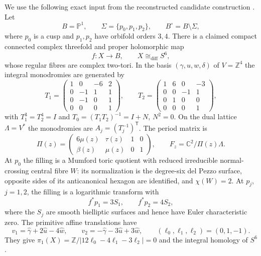 \documentclass[11pt]{article}
\theoremstyle{definition}
\newcommand{\C}{\mathbb C}
\newcommand{\Z}{\mathbb Z}
\newcommand{\PP}{\mathbb P}
\begin{document}
We use the following exact input from the reconstructed candidate
construction \cite{AlpogeS6_2026}.  Let
\[
 B=\PP^1,\qquad \Sigma=\{p_0,p_1,p_2\},\qquad
 B^\circ=B\setminus\Sigma,
\]
where $p_0$ is a cusp and $p_1,p_2$ have orbifold orders $3,4$.
There is a claimed compact connected complex threefold and proper
holomorphic map
\[
 f:X\longrightarrow B,
 \qquad X\cong_{\mathrm{diff}}S^6,
\]
whose regular fibres are complex two-tori.  In the basis
$(\gamma,u,w,\delta)$ of $V=\Z^4$ the integral monodromies are generated by
\begin{equation}
 T_1=
 \begin{pmatrix}1&0&-6&2\\0&-1&1&1\\0&-1&0&1\\0&0&0&1\end{pmatrix},
 \qquad
 T_2=
 \begin{pmatrix}1&6&0&-3\\0&0&-1&1\\0&1&0&0\\0&0&0&1\end{pmatrix},
 \label{eq:original-T}
\end{equation}
with $T_1^3=T_2^4=I$ and
$T_0=(T_1T_2)^{-1}=I+N$, $N^2=0$.  On the dual lattice
$\Lambda=V^*$ the monodromies are
$A_j=(T_j^{-1})^{\mathsf T}$.  The period matrix is
\begin{equation}
 \Pi(z)=
 \begin{pmatrix}6\mu(z)&\tau(z)&1&0\\
                 \beta(z)&\mu(z)&0&1\end{pmatrix},
 \qquad F_z=\C^2/\Pi(z)\Lambda .
 \label{eq:original-period}
\end{equation}
At $p_0$ the filling is a Mumford toric quotient with reduced irreducible
normal-crossing central fibre $W$: its normalization is the degree-six
del Pezzo surface, opposite sides of its anticanonical hexagon are
identified, and $\chi(W)=2$.  At $p_j$, $j=1,2$, the filling is a
logarithmic transform with
\[
 f^*p_1=3S_1,\qquad f^*p_2=4S_2,
\]
where the $S_j$ are smooth bielliptic surfaces and hence have Euler
characteristic zero.  The primitive affine translations have
\begin{equation}
 v_1=\widehat\gamma+2\widehat u-4\widehat w,\qquad
 v_2=-\widehat\gamma-3\widehat u+3\widehat w,\qquad
 (\ell_0,\ell_1,\ell_2)=(0,1,-1).
 \label{eq:original-twists}
\end{equation}
They give
$\pi_1(X)=\Z/|12\ell_0-4\ell_1-3\ell_2|=0$ and the integral homology of
$S^6$.
\end{document}
